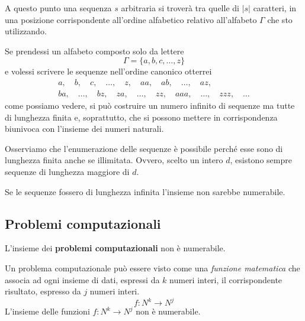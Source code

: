 A questo punto una sequenza $s$ arbitraria si trover\`a tra quelle di $| s |$ caratteri, in una posizione corrispondente
all'ordine alfabetico relativo all'alfabeto $\Gamma$ che sto utilizzando.

\begin{example}
	Se prendessi un alfabeto composto solo da lettere
	\[ \Gamma = \{ a, b, c, \dots, z \} \]
	e volessi scrivere le sequenze nell'ordine canonico otterrei
	\begin{gather*}
		a, \quad b, \quad c, \quad \dots, \quad z, \quad aa, \quad ab, \quad \dots, \quad az, \\
		ba, \quad \dots, \quad bz, \quad za, \quad \dots, \quad zz, \quad aaa, \quad \dots, \quad zzz, \quad \dots
	\end{gather*}
	come possiamo vedere, si pu\`o costruire un numero infinito di sequenze ma tutte di lunghezza finita e, soprattutto,
	che si possono mettere in corrispondenza biunivoca con l'insieme dei numeri naturali.
\end{example}

Osserviamo che l'enumerazione delle sequenze \`e possibile perch\'e esse sono di lunghezza finita anche se illimitata.
Ovvero, scelto un intero $d$, esistono sempre sequenze di lunghezza maggiore di $d$.

Se le sequenze fossero di lunghezza infinita l'insieme non sarebbe numerabile.

\subsection{Problemi computazionali}
\begin{theorem}
	L'insieme dei \textbf{problemi computazionali} non \`e numerabile.
\end{theorem}

Un problema computazionale pu\`o essere visto come una \emph{funzione matematica} che associa ad ogni insieme di dati,
espressi da $k$ numeri interi, il corrispondente risultato, espresso da $j$ numeri interi.
\[ f : N^k \rightarrow N^j \]
L'insieme delle funzioni $f : N^k \rightarrow N^j$ non \`e numerabile.

